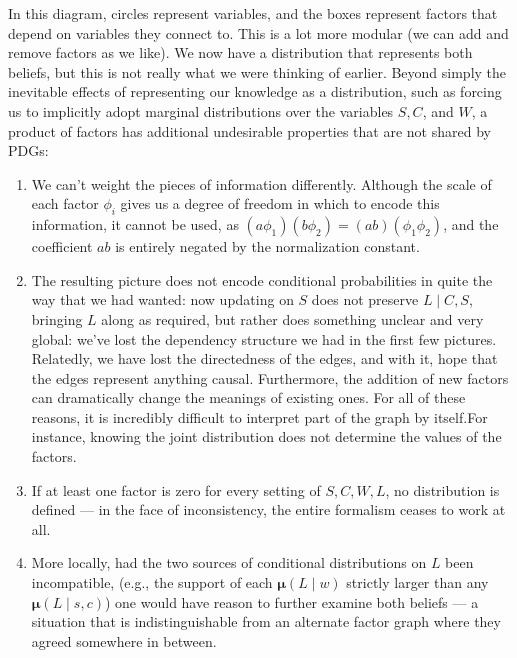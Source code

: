 \documentclass{article}
\newcommand{\MNs}{PDGs}
\newcommand\bmu{\boldsymbol{\mu}}
\begin{document}
\begin{example}[continues=ex:planet]
\begin{center}
		\end{center}
	 	In this diagram, circles represent variables, and the boxes represent factors that depend on variables they connect to.
		This is a lot more modular (we can add and remove factors as we like). We now have a distribution that represents both beliefs, but this is not really what we were thinking of earlier. Beyond simply the inevitable effects of representing our knowledge as a distribution, such as forcing us to implicitly adopt marginal distributions over the variables $S,C$, and $W$, a product of factors has additional undesirable properties that are not shared by \MNs:

		\begin{enumerate}
			\item We can't weight the pieces of information differently. Although the scale of each factor $\phi_i$ gives us a degree of freedom in which to encode this information, it cannot be used, as $(a\phi_1) (b\phi_2) = (ab) (\phi_1\phi_2)$, and the coefficient $ab$ is entirely negated by the normalization constant.			

			\item The resulting picture does not encode conditional probabilities in quite the way that we had wanted: now updating on $S$ does not preserve $L\mid C,S$, bringing $L$ along as required, but rather does something unclear and very global: we've lost the dependency structure we had in the first few pictures. Relatedly, we have lost the directedness of the edges, and with it, hope that the edges represent anything causal. Furthermore, the addition of new factors can dramatically change the meanings of existing ones. 
			For all of these reasons, it is incredibly difficult to interpret part of the graph by itself.For instance, knowing the joint distribution does not determine the values of the factors.
			
			\item If at least one factor is zero for every setting of $S,C,W,L$, no distribution is defined --- in the face of inconsistency, the entire formalism ceases to work at all.
			
			\item More locally, had the two sources of conditional distributions on $L$ been incompatible, (e.g., the support of each $\bmu(L\mid w)$ strictly larger than any $\bmu(L\mid s,c)$) one would have reason to further examine both beliefs --- a situation that is indistinguishable from an alternate factor graph where they agreed somewhere in between.	
		\end{enumerate}		
	\end{example}	
	
\end{document}
